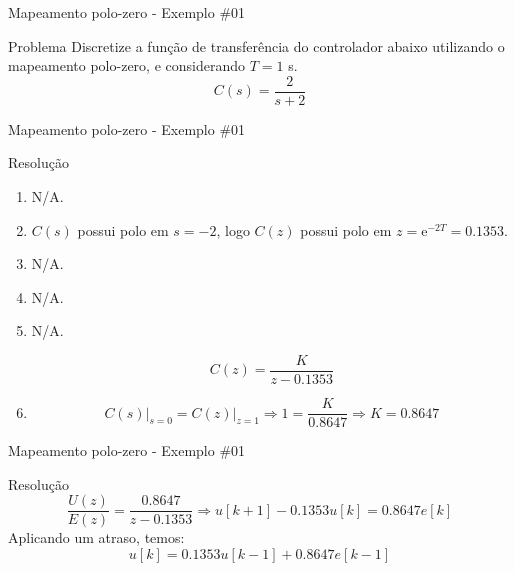 \begin{frame}{Mapeamento polo-zero - Exemplo \#01}
\begin{block}{Problema}
Discretize a função de transferência do controlador abaixo utilizando o mapeamento polo-zero, e considerando $T= \num{1}$ s.
	\[ C(s)=\dfrac{2}{s+2} \]
\end{block}
\end{frame}

\begin{frame}{Mapeamento polo-zero - Exemplo \#01}
\begin{block}{Resolução}
	\begin{enumerate}
		\item N/A.
		
		\item $ C(s) $ possui polo em $ s=-2 $, logo $ C(z) $ possui polo em $ z=\text{e}^{-2T}=\num{0,1353} $.
		
		\item N/A.
		
		\item N/A.
		
		\item N/A.
		
		\[ C(z)=\dfrac{K}{z-\num{0,1353}} \]
		
		\item
		\[
		C(s)\Big|_{s=0}=C(z)\Big|_{z=1}\Rightarrow 1=\dfrac{K}{\num{0,8647}}\Rightarrow K=\num{0,8647} \]
	\end{enumerate}
\end{block}
\end{frame}

\begin{frame}{Mapeamento polo-zero - Exemplo \#01}
\begin{block}{Resolução}
    \[ \dfrac{U(z)}{E(z)}=\dfrac{\num{0,8647}}{z-\num{0,1353}}\Rightarrow u[k+1] - \num{0,1353} u[k]=\num{0,8647}e[k] \]
	Aplicando um atraso, temos:
	\[ u[k]=\num{0,1353}u[k-1]+\num{0,8647}e[k-1] \]
\end{block}
\end{frame}

